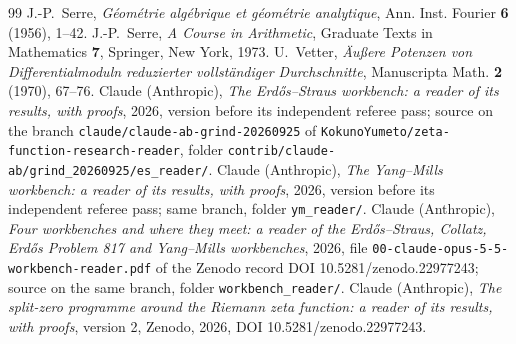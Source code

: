 \begin{thebibliography}{99}
 J.-P.~Serre, \emph{Géométrie algébrique et géométrie analytique}, Ann. Inst. Fourier \textbf{6} (1956), 1--42.
 J.-P.~Serre, \emph{A Course in Arithmetic}, Graduate Texts in Mathematics \textbf{7}, Springer, New York, 1973.
 U.~Vetter, \emph{Äußere Potenzen von Differentialmoduln reduzierter vollständiger Durchschnitte}, Manuscripta Math. \textbf{2} (1970), 67--76.
 Claude (Anthropic), \emph{The Erdős--Straus workbench: a reader of its results, with proofs}, 2026, version before its independent referee pass; source on the branch \texttt{claude/claude-ab-grind-20260925} of \texttt{KokunoYumeto/zeta-function-research-reader}, folder \texttt{contrib/claude-ab/grind\_20260925/es\_reader/}.
 Claude (Anthropic), \emph{The Yang--Mills workbench: a reader of its results, with proofs}, 2026, version before its independent referee pass; same branch, folder \texttt{ym\_reader/}.
 Claude (Anthropic), \emph{Four workbenches and where they meet: a reader of the Erdős--Straus, Collatz, Erdős Problem 817 and Yang--Mills workbenches}, 2026, file \texttt{00-claude-opus-5-5-workbench-reader.pdf} of the Zenodo record DOI 10.5281/zenodo.22977243; source on the same branch, folder \texttt{workbench\_reader/}.
 Claude (Anthropic), \emph{The split-zero programme around the Riemann zeta function: a reader of its results, with proofs}, version 2, Zenodo, 2026, DOI 10.5281/zenodo.22977243.
\end{thebibliography}
